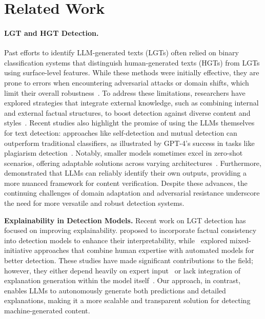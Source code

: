 \section{Related Work}
\paragraph{LGT and HGT Detection.}
Past efforts to identify LLM-generated texts (LGTs) often relied on binary classification systems that distinguish human-generated texts (HGTs) from LGTs using surface-level features. While these methods were initially effective, they are prone to errors when encountering adversarial attacks or domain shifts, which limit their overall robustness~\cite{bhattacharjee2024fighting, dugan2024raid}. To address these limitations, researchers have explored strategies that integrate external knowledge, such as combining internal and external factual structures, to boost detection against diverse content and styles~\cite{ideate2024}. Recent studies also highlight the promise of using the LLMs themselves for text detection: approaches like self-detection and mutual detection can outperform traditional classifiers, as illustrated by GPT-4's success in tasks like plagiarism detection~\cite{plagbench2024}. Notably, smaller models sometimes excel in zero-shot scenarios, offering adaptable solutions across varying architectures~\cite{smallerLLM2024}. Furthermore, \citet{lee2023do} demonstrated that LLMs can reliably identify their own outputs, providing a more nuanced framework for content verification. Despite these advances, the continuing challenges of domain adaptation and adversarial resistance underscore the need for more versatile and robust detection systems.



\textbf{Explainability in Detection Models.}
Recent work on LGT detection has focused on improving explainability. \citet{zhou2024humanizing} proposed to incorporate factual consistency into detection models to enhance their interpretability, while~\citet{weng2024understanding} explored mixed-initiative approaches that combine human expertise with automated models for better detection. These studies have made significant contributions to the field; however, they either depend heavily on expert input~\cite{weng2024understanding} or lack integration of explanation generation within the model itself~\cite{zhou2024humanizing}. Our approach, in contrast, enables LLMs to autonomously generate both predictions and detailed explanations, making it a more scalable and transparent solution for detecting machine-generated content.

